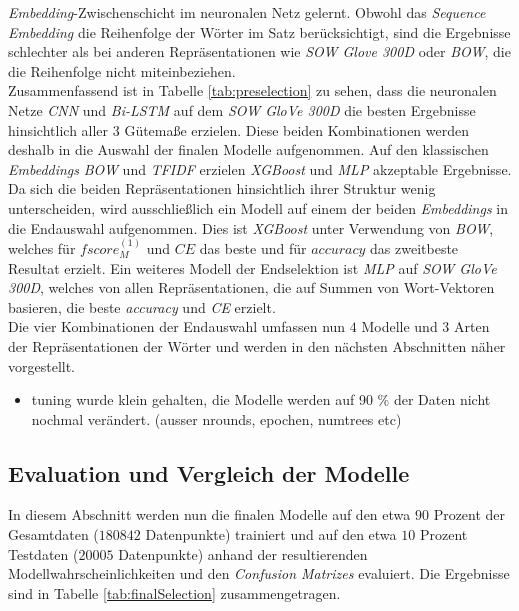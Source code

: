 \documentclass[a4paper,11pt]{article}
\begin{document}
\textit{Embedding}-Zwischenschicht im neuronalen Netz gelernt. Obwohl das \textit{Sequence} \textit{Embedding} die Reihenfolge der Wörter im Satz berücksichtigt, sind die Ergebnisse schlechter als bei anderen Repräsentationen wie \textit{SOW Glove 300D} oder \textit{BOW}, die die Reihenfolge nicht miteinbeziehen.\\

Zusammenfassend ist in Tabelle \ref{tab:preselection} zu sehen, dass die neuronalen Netze \textit{CNN} und \textit{Bi-LSTM} auf dem \textit{SOW GloVe 300D} die besten Ergebnisse hinsichtlich aller $3$ Gütemaße erzielen. Diese beiden Kombinationen werden deshalb in die Auswahl der finalen Modelle aufgenommen. Auf den klassischen \textit{Embeddings} \textit{BOW} und \textit{TFIDF} erzielen \textit{XGBoost} und \textit{MLP} akzeptable Ergebnisse. Da sich die beiden Repräsentationen hinsichtlich ihrer Struktur wenig unterscheiden, wird ausschließlich ein Modell auf einem der beiden \textit{Embeddings} in die Endauswahl aufgenommen. Dies ist \textit{XGBoost} unter Verwendung von \textit{BOW}, welches für $fscore_M^{(1)}$ und $CE$ das beste und für $accuracy$ das zweitbeste Resultat erzielt. Ein weiteres Modell der Endselektion ist \textit{MLP} auf \textit{SOW GloVe 300D}, welches von allen Repräsentationen, die auf Summen von Wort-Vektoren basieren, die beste \textit{accuracy} und \textit{CE} erzielt. \\

Die vier Kombinationen der Endauswahl umfassen nun $4$ Modelle und $3$ Arten der Repräsentationen der Wörter und werden in den nächsten Abschnitten näher vorgestellt.




\begin{itemize}
    \item tuning wurde klein gehalten, die Modelle werden auf 90 \% der Daten nicht nochmal verändert. (ausser nrounds, epochen, numtrees etc)
\end{itemize}{}

\subsection{Evaluation und Vergleich der Modelle} \label{kap:evalFinal}

In diesem Abschnitt werden nun die finalen Modelle auf den etwa $90$ Prozent der Gesamtdaten ($180842$ Datenpunkte) trainiert und auf den etwa $10$ Prozent Testdaten ($20005$ Datenpunkte) anhand der resultierenden Modellwahrscheinlichkeiten und den \textit{Confusion Matrizes} evaluiert. Die Ergebnisse sind in Tabelle \ref{tab:finalSelection} zusammengetragen. 
\end{document}
